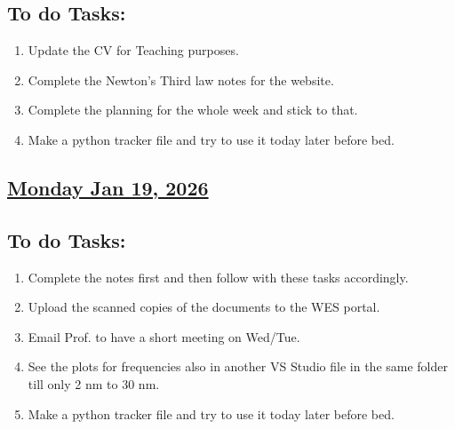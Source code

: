 \subsection*{To do Tasks:}
\begin{enumerate}
    \item Update the CV for Teaching purposes. \cmark
    \item Complete the Newton's Third law notes for the website. \cmark  [partial]
    \item Complete the planning for the whole week and stick to that. \cmark 
    \item Make a python tracker file and try to use it today later before bed. \xmark
\end{enumerate}
\subsection*{\underline{Monday Jan 19, 2026}}
\subsection*{To do Tasks:}
\begin{enumerate}
    \item Complete the notes first and then follow with these tasks accordingly.\cmark
    \item Upload the scanned copies of the documents to the WES portal. \cmark
    \item Email Prof. to have a short meeting on Wed/Tue. \cmark
    \item See the plots for frequencies also in another VS Studio file in the same folder till only 2 nm to 30 nm.\cmark
    \item Make a python tracker file and try to use it today later before bed.
\end{enumerate}
